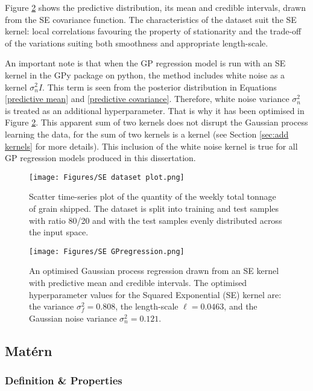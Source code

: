 \documentclass[12pt,a4paper]{article}
\begin{document}
Figure \ref{fig:SE GPregression} shows the predictive distribution, its mean and credible intervals, drawn from the SE covariance function. The characteristics of the dataset suit the SE kernel: local correlations favouring the property of stationarity and the trade-off of the variations suiting both smoothness and appropriate length-scale.  

An important note is that when the GP regression model is run with an SE kernel in the GPy package on python, the method includes white noise as a kernel \(\sigma_n^2 I\). This term is seen from the posterior distribution in Equations \eqref{predictive mean} and \eqref{predictive covariance}. Therefore, white noise variance \(\sigma_n^2\) is treated as an additional hyperparameter. That is why it has been optimised in Figure \ref{fig:SE GPregression}. This apparent sum of two kernels does not disrupt the Gaussian process learning the data, for the sum of two kernels is a kernel (see Section \ref{sec:add kernels} for more details). This inclusion of the white noise kernel is true for all GP regression models produced in this dissertation. 

\begin{figure}[h]
\centering
\texttt{[image: Figures/SE dataset plot.png]} 
\caption{Scatter time-series plot of the quantity of the weekly total tonnage of grain shipped. The dataset is split into training and test samples with ratio 80/20 and with the test samples evenly distributed across the input space.} \label{fig:SE dataset plot}
\end{figure}

\begin{figure}[h]
\centering
\texttt{[image: Figures/SE GPregression.png]} 
\caption{An optimised Gaussian process regression drawn from an SE kernel with predictive mean and credible intervals. The optimised hyperparameter values for the Squared Exponential (SE) kernel are: the variance \(\sigma_f^2 = 0.808\), the length-scale \(\ell = 0.0463\), and the Gaussian noise variance \(\sigma_n^2 = 0.121\).} \label{fig:SE GPregression}
\end{figure}

\subsection{Mat\'{e}rn}
\label{sec:Matern}

\subsubsection{Definition \& Properties}
\end{document}
